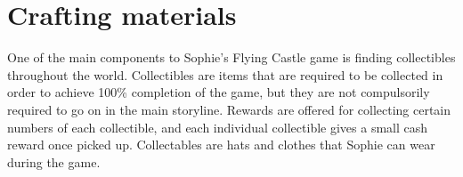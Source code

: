 \section{Crafting materials}
One of the main components to Sophie's Flying Castle game is finding collectibles throughout the world.
Collectibles are items that are required to be collected in order to achieve 100\%
completion of the game, but they are not compulsorily required to go on in the main storyline. Rewards are offered for collecting certain numbers of each
collectible, and each individual collectible gives a small cash reward once picked up. Collectables are hats and clothes that Sophie
can wear during the game. 


